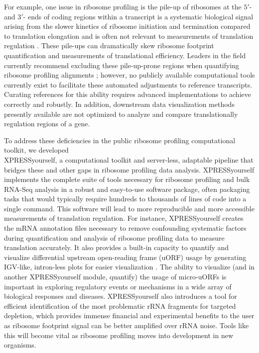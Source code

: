 \documentclass[10pt, oneside]{article}
\begin{document}
For example, one issue in ribosome profiling is the pile-up of ribosomes at the $5'$- and $3'$- ends of coding regions within a transcript is a systematic biological signal arising from the slower kinetics of ribosome initiation and termination compared to translation elongation and is often not relevant to measurements of translation regulation \cite{gerashchenko_nar, artieri_gr, hussman_plosg}. These pile-ups can dramatically skew ribosome footprint quantification and measurements of translational efficiency. Leaders in the field currently recommend excluding these pile-up-prone regions when quantifying ribosome profiling alignments \cite{ingolia_meth, weinberg_reports}; however, no publicly available computational tools currently exist to facilitate these automated adjustments to reference transcripts. Curating references for this ability requires advanced implementations to achieve correctly and robustly. In addition, downstream data visualization methods presently available are not optimized to analyze and compare translationally regulation regions of a gene. \par

To address these deficiencies in the public ribosome profiling computational toolkit, we developed \\XPRESSyourself, a computational toolkit and server-less, adaptable pipeline that bridges these and other gaps in ribosome profiling data analysis. XPRESSyourself implements the complete suite of tools necessary for ribosome profiling and bulk RNA-Seq analysis in a robust and easy-to-use software package, often packaging tasks that would typically require hundreds to thousands of lines of code into a single command. This software will lead to more reproducible and more accessible measurements of translation regulation. For instance, XPRESSyourself creates the mRNA annotation files necessary to remove confounding systematic factors during quantification and analysis of ribosome profiling data to measure translation accurately. It also provides a built-in capacity to quantify and visualize differential upstream open-reading frame (uORF) usage by generating IGV-like, intron-less plots for easier visualization \cite{igv}. The ability to visualize (and in another XPRESSyourself module, quantify) the usage of micro-uORFs is important in exploring regulatory events or mechanisms in a wide array of biological responses and diseases. XPRESSyourself also introduces a tool for efficient identification of the most problematic rRNA fragments for targeted depletion, which provides immense financial and experimental benefits to the user as ribosome footprint signal can be better amplified over rRNA noise. Tools like this will become vital as ribosome profiling moves into development in new organisms.\par
\end{document}
